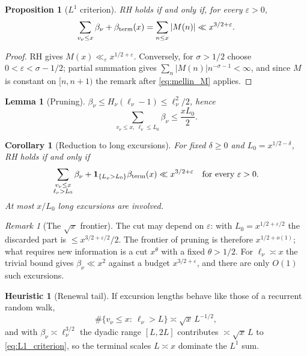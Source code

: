 \documentclass[11pt]{amsart}
\numberwithin{equation}{section}
\theoremstyle{plain}
\newtheorem{proposition}[theorem]{Proposition}
\newtheorem{lemma}[theorem]{Lemma}
\newtheorem{corollary}[theorem]{Corollary}
\theoremstyle{definition}
\newtheorem{heuristic}[theorem]{Heuristic}
\theoremstyle{remark}
\newtheorem{remark}[theorem]{Remark}
\newcommand{\eps}{\varepsilon}
\begin{document}
\begin{proposition}[$L^1$ criterion]
\label{prop:L1}
RH holds if and only if, for every $\eps>0$,
\begin{equation}
\label{eq:L1_criterion}
  \sum_{v_\nu\le x}\beta_\nu+\beta_{\rm term}(x)=\sum_{n\le x}|M(n)|
  \ll x^{3/2+\eps}.
\end{equation}
\end{proposition}

\begin{proof}
RH gives $M(x)\ll_\eps x^{1/2+\eps}$. Conversely, for $\sigma>1/2$ choose
$0<\eps<\sigma-1/2$; partial summation gives
$\sum_n|M(n)|n^{-\sigma-1}<\infty$, and since $M$ is constant on $[n,n+1)$
the remark after \eqref{eq:mellin_M} applies.
\end{proof}

\begin{lemma}[Pruning]
\label{lem:pruning}
$\beta_\nu\le H_\nu(\ell_\nu-1)\le\ell_\nu^2/2$, hence
\begin{equation}
\label{eq:pruning}
  \sum_{v_\nu\le x,\ \ell_\nu\le L_0}\beta_\nu\le\frac{xL_0}{2}.
\end{equation}
\end{lemma}

\begin{corollary}[Reduction to long excursions]
\label{cor:long}
For fixed $\delta\ge0$ and $L_0=x^{1/2-\delta}$, RH holds if and only if
\begin{equation}
\label{eq:long_reduction}
  \sum_{\substack{v_\nu\le x\\ \ell_\nu>L_0}}\beta_\nu
  +\mathbf 1_{\{L_x>L_0\}}\beta_{\rm term}(x)\ll x^{3/2+\eps}
  \quad\text{for every }\eps>0.
\end{equation}
At most $x/L_0$ long excursions are involved.
\end{corollary}

\begin{remark}[The $\sqrt{x}$ frontier]
\label{rem:sqrt_frontier}
The cut may depend on $\eps$: with $L_0=x^{1/2+\eps/2}$ the discarded part is
$\le x^{3/2+\eps/2}/2$. The frontier of pruning is therefore $x^{1/2+o(1)}$;
what requires new information is a cut $x^{\theta}$ with a fixed
$\theta>1/2$. For $\ell_\nu\asymp x$ the trivial bound gives
$\beta_\nu\ll x^2$ against a budget $x^{3/2+\eps}$, and there are only
$O(1)$ such excursions.
\end{remark}

\begin{heuristic}[Renewal tail]
\label{heu:renewal}
If excursion lengths behave like those of a recurrent random walk,
\begin{equation}
\label{eq:renewal_tail}
  \#\{v_\nu\le x:\ \ell_\nu>L\}\asymp\sqrt{x}\,L^{-1/2},
\end{equation}
and with $\beta_\nu\asymp\ell_\nu^{3/2}$ the dyadic range $[L,2L]$
contributes $\asymp\sqrt{x}\,L$ to \eqref{eq:L1_criterion}, so the terminal
scales $L\asymp x$ dominate the $L^1$ sum.
\end{heuristic}
\end{document}

